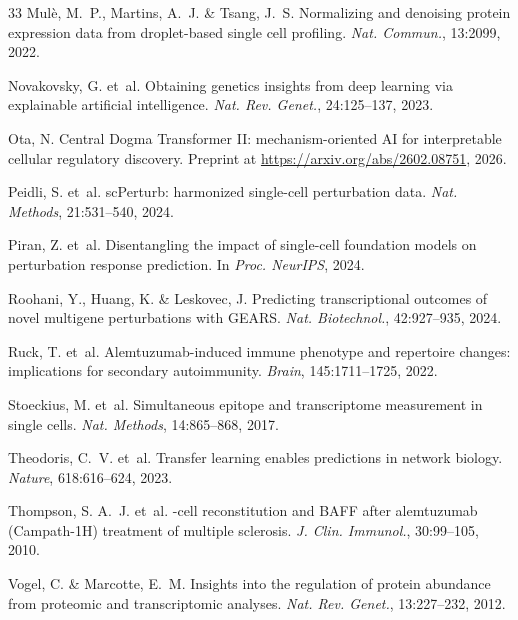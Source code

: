 \documentclass{article}
\begin{document}
\begin{thebibliography}{33}
Mul\`{e}, M.~P., Martins, A.~J. \& Tsang, J.~S.
\newblock Normalizing and denoising protein expression data from droplet-based single cell profiling.
\newblock \emph{Nat. Commun.}, 13:2099, 2022.

Novakovsky, G. et~al.
\newblock Obtaining genetics insights from deep learning via explainable artificial intelligence.
\newblock \emph{Nat. Rev. Genet.}, 24:125--137, 2023.

Ota, N.
\newblock Central Dogma Transformer {II}: mechanism-oriented {AI} for interpretable cellular regulatory discovery.
\newblock Preprint at \url{https://arxiv.org/abs/2602.08751}, 2026.

Peidli, S. et~al.
\newblock sc{P}erturb: harmonized single-cell perturbation data.
\newblock \emph{Nat. Methods}, 21:531--540, 2024.

Piran, Z. et~al.
\newblock Disentangling the impact of single-cell foundation models on perturbation response prediction.
\newblock In \emph{Proc. NeurIPS}, 2024.

Roohani, Y., Huang, K. \& Leskovec, J.
\newblock Predicting transcriptional outcomes of novel multigene perturbations with {GEARS}.
\newblock \emph{Nat. Biotechnol.}, 42:927--935, 2024.

Ruck, T. et~al.
\newblock Alemtuzumab-induced immune phenotype and repertoire changes: implications for secondary autoimmunity.
\newblock \emph{Brain}, 145:1711--1725, 2022.

Stoeckius, M. et~al.
\newblock Simultaneous epitope and transcriptome measurement in single cells.
\newblock \emph{Nat. Methods}, 14:865--868, 2017.

Theodoris, C.~V. et~al.
\newblock Transfer learning enables predictions in network biology.
\newblock \emph{Nature}, 618:616--624, 2023.

Thompson, S. A.~J. et~al.
-cell reconstitution and {BAFF} after alemtuzumab ({Campath-1H}) treatment of multiple sclerosis.
\newblock \emph{J. Clin. Immunol.}, 30:99--105, 2010.

Vogel, C. \& Marcotte, E.~M.
\newblock Insights into the regulation of protein abundance from proteomic and transcriptomic analyses.
\newblock \emph{Nat. Rev. Genet.}, 13:227--232, 2012.


\end{thebibliography}
\end{document}

